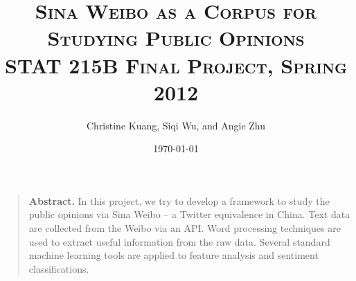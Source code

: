 \documentclass[11pt]{article}
\title{\scshape Sina Weibo as a Corpus for Studying Public Opinions
	\\{\Large STAT 215B Final Project, Spring 2012} }
\author{Christine Kuang, Siqi Wu, and Angie Zhu}
\date{\today} %
\newcommand{\1}[1]{{\mathbf 1}\left\{#1\right\}}        %
\begin{document}
\setlength\footskip{0.5in}


\lstset{
showspaces=false, 
language=R, 
basicstyle=\ttfamily, 
tabsize=3, 
showstringspaces=false, 
columns=flexible%
}

\maketitle








\begin{quote}
{\bf Abstract.} In this project, we try to develop a framework to study the public opinions via Sina Weibo -- a Twitter equivalence in China. Text data are collected from the Weibo via an API. Word processing techniques are used to extract useful information from the raw data. Several standard machine learning tools are applied to feature analysis and sentiment classifications. 
\end{quote}
\end{document}
